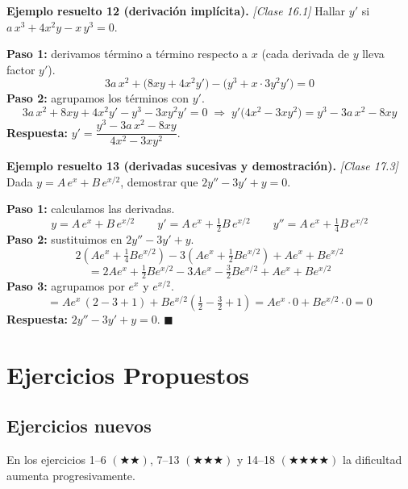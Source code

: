 \documentclass[12pt, letterpaper]{article}
\begin{document}
\newpage
\noindent\textbf{Ejemplo resuelto 12 (derivación implícita).} \emph{[Clase 16.1]}
Hallar $y'$ si $a\,x^{3} + 4x^{2}y - x\,y^{3} = 0$.

\begin{cuadrosolucion}
  \textbf{Paso 1:} derivamos término a término respecto a $x$ (cada derivada de $y$ lleva factor $y'$).
  \[
    3a\,x^{2} + \bigl(8xy + 4x^{2}y'\bigr) - \bigl(y^{3} + x\cdot 3y^{2}y'\bigr) = 0
  \]
  \textbf{Paso 2:} agrupamos los términos con $y'$.
  \[
    3a\,x^{2} + 8xy + 4x^{2}y' - y^{3} - 3xy^{2}y' = 0
    \;\Longrightarrow\;
    y'\bigl(4x^{2} - 3xy^{2}\bigr) = y^{3} - 3a\,x^{2} - 8xy
  \]
  \textbf{Respuesta:} $y' = \dfrac{y^{3} - 3a\,x^{2} - 8xy}{4x^{2} - 3xy^{2}}$.
\end{cuadrosolucion}

\noindent\textbf{Ejemplo resuelto 13 (derivadas sucesivas y demostración).} \emph{[Clase 17.3]}
Dada $y = A\,e^{x} + B\,e^{x/2}$, demostrar que $2y'' - 3y' + y = 0$.

\begin{cuadrosolucion}
  \textbf{Paso 1:} calculamos las derivadas.
  \[
    y = A\,e^{x} + B\,e^{x/2}
    \qquad
    y' = A\,e^{x} + \tfrac{1}{2}B\,e^{x/2}
    \qquad
    y'' = A\,e^{x} + \tfrac{1}{4}B\,e^{x/2}
  \]
  \textbf{Paso 2:} sustituimos en $2y'' - 3y' + y$.
  \[
    2\left(Ae^{x} + \tfrac{1}{4}Be^{x/2}\right) - 3\left(Ae^{x} + \tfrac{1}{2}Be^{x/2}\right) + Ae^{x} + Be^{x/2}
  \]
  \[
    = 2Ae^{x} + \tfrac{1}{2}Be^{x/2} - 3Ae^{x} - \tfrac{3}{2}Be^{x/2} + Ae^{x} + Be^{x/2}
  \]
  \textbf{Paso 3:} agrupamos por $e^{x}$ y $e^{x/2}$.
  \[
    = Ae^{x}\,(2 - 3 + 1) + Be^{x/2}\left(\tfrac{1}{2} - \tfrac{3}{2} + 1\right)
    = Ae^{x}\cdot 0 + Be^{x/2}\cdot 0 = 0
  \]
  \textbf{Respuesta:} $2y'' - 3y' + y = 0$. \hfill $\blacksquare$
\end{cuadrosolucion}

\newpage
\section{Ejercicios Propuestos}

\subsection{Ejercicios nuevos}

\noindent En los ejercicios 1--6 $(\bigstar\bigstar)$, 7--13 $(\bigstar\bigstar\bigstar)$ y 14--18 $(\bigstar\bigstar\bigstar\bigstar)$ la dificultad aumenta progresivamente.
\end{document}
